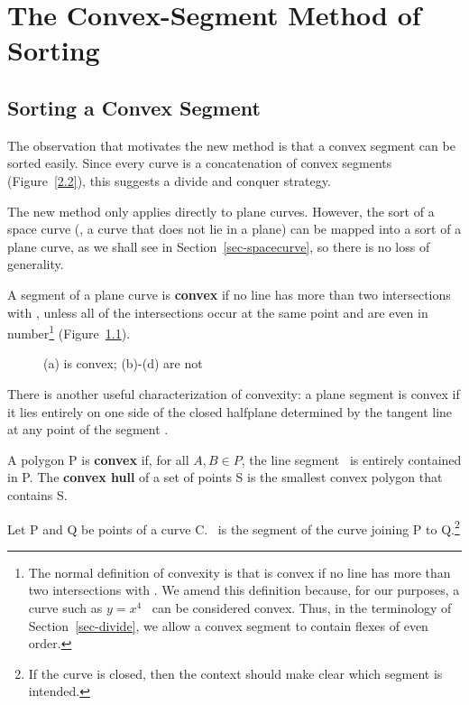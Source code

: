 \chapter{The Convex-Segment Method of Sorting}
\section{Sorting a Convex Segment}
\label{sec-2.1}

The observation that motivates the new method is that 
a convex segment can be sorted easily.
Since every curve is a concatenation of convex segments (Figure~\ref{2.2}),
this suggests a divide and conquer strategy.
%

The new method only applies directly to plane curves.
However, the sort of a space curve
(\ie, a curve that does not lie in a plane)
can be mapped into a sort of a plane curve,
as we shall see in Section~\ref{sec-spacecurve}, so there is
no loss of generality.

\begin{definition}
A segment  of a plane curve is {\bf convex} if no line has more than 
two intersections with , unless all of the intersections occur at
the same point and are even in number\footnote{The normal definition of 
convexity is that 
 is convex if no line has more than two intersections with .
We amend this definition because, for our purposes, a curve such as 
\mbox{$y=x^{4}$ } can be considered convex.
Thus, in the terminology of Section~\ref{sec-divide}, we allow a convex 
segment to contain flexes of even order.} (Figure~\ref{2.1}).
%
\begin{figure}[htb]\vspace{4.75in}\caption{(a) is convex; (b)-(d) are not}\label{2.1}\end{figure}
%

There is another useful characterization of convexity:
a plane segment is convex if it lies entirely on one side of
the closed halfplane determined by the tangent line at any point of
the segment \cite{docarmo}. 
\end{definition}
\begin{definition}
A polygon P is {\bf convex} if, for all $A,B \in P$, the line 
segment \ is entirely contained in P.
The {\bf convex hull} of a set of points S
is the smallest convex polygon that contains S.
\end{definition}
%
\begin{notation}
Let P and Q be points of a curve C.
\pq\ is the segment of the curve joining P to Q.\footnote{If the 
curve is closed, then the context should make clear which segment is
intended.}
\end{notation}

